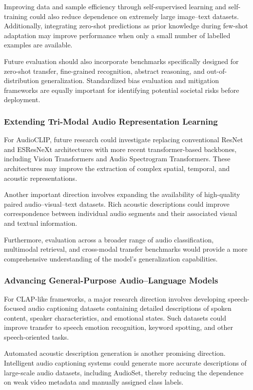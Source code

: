 \documentclass[pdflatex,sn-mathphys-num]{sn-jnl}%
\theoremstyle{thmstyleone}%
\theoremstyle{thmstyletwo}%
\theoremstyle{thmstylethree}%
\begin{document}
Improving data and sample efficiency through self-supervised learning and self-training could also reduce dependence on extremely large image--text datasets. Additionally, integrating zero-shot predictions as prior knowledge during few-shot adaptation may improve performance when only a small number of labelled examples are available.

Future evaluation should also incorporate benchmarks specifically designed for zero-shot transfer, fine-grained recognition, abstract reasoning, and out-of-distribution generalization. Standardized bias evaluation and mitigation frameworks are equally important for identifying potential societal risks before deployment.

\subsubsection{Extending Tri-Modal Audio Representation Learning}

For AudioCLIP, future research could investigate replacing conventional ResNet and ESResNeXt architectures with more recent transformer-based backbones, including Vision Transformers and Audio Spectrogram Transformers. These architectures may improve the extraction of complex spatial, temporal, and acoustic representations.

Another important direction involves expanding the availability of high-quality paired audio--visual--text datasets. Rich acoustic descriptions could improve correspondence between individual audio segments and their associated visual and textual information.

Furthermore, evaluation across a broader range of audio classification, multimodal retrieval, and cross-modal transfer benchmarks would provide a more comprehensive understanding of the model's generalization capabilities.

\subsubsection{Advancing General-Purpose Audio--Language Models}

For CLAP-like frameworks, a major research direction involves developing speech-focused audio captioning datasets containing detailed descriptions of spoken content, speaker characteristics, and emotional states. Such datasets could improve transfer to speech emotion recognition, keyword spotting, and other speech-oriented tasks.

Automated acoustic description generation is another promising direction. Intelligent audio captioning systems could generate more accurate descriptions of large-scale audio datasets, including AudioSet, thereby reducing the dependence on weak video metadata and manually assigned class labels.
\end{document}
